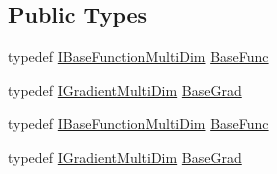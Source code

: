 \subsection*{Public Types}
\begin{DoxyCompactItemize}
\item 
typedef \mbox{\hyperlink{classROOT_1_1Math_1_1IBaseFunctionMultiDim}{I\+Base\+Function\+Multi\+Dim}} \mbox{\hyperlink{classROOT_1_1Math_1_1IGradientFunctionMultiDim_a803074495bafb5acf9f130b648001609}{Base\+Func}}
\item 
typedef \mbox{\hyperlink{classROOT_1_1Math_1_1IGradientMultiDim}{I\+Gradient\+Multi\+Dim}} \mbox{\hyperlink{classROOT_1_1Math_1_1IGradientFunctionMultiDim_a743fb0cecf99775cca175ca1edd603af}{Base\+Grad}}
\item 
typedef \mbox{\hyperlink{classROOT_1_1Math_1_1IBaseFunctionMultiDim}{I\+Base\+Function\+Multi\+Dim}} \mbox{\hyperlink{classROOT_1_1Math_1_1IGradientFunctionMultiDim_a803074495bafb5acf9f130b648001609}{Base\+Func}}
\item 
typedef \mbox{\hyperlink{classROOT_1_1Math_1_1IGradientMultiDim}{I\+Gradient\+Multi\+Dim}} \mbox{\hyperlink{classROOT_1_1Math_1_1IGradientFunctionMultiDim_a743fb0cecf99775cca175ca1edd603af}{Base\+Grad}}
\end{DoxyCompactItemize}
